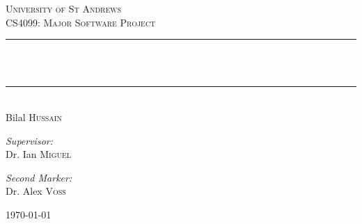 
\begin{titlepage}
\thispagestyle{empty}
\begin{center}



\textsc{\LARGE University of St Andrews}\\[10pt]
\textsc{\large CS4099: Major Software Project}\\[2cm]


\newcommand{\HRule}{\rule{9cm}{0.5mm}}

\HRule\\[10pt]
{ \Huge \bfseries \theTitle }\\
\HRule\\[20pt]
{ \LARGE Bilal \textsc{Hussain}}
\vspace{1.5cm}

\begin{minipage}{0.4\textwidth}
\begin{flushleft} \large
\emph{Supervisor:} \\
Dr. Ian  \textsc{Miguel}
\end{flushleft}
\end{minipage}
\begin{minipage}{0.4\textwidth}
\begin{flushright} \large
\emph{Second Marker:} \\
Dr. Alex \textsc{Voss}
\end{flushright}
\end{minipage}

\vfill

{\large \today}
\end{center}
\end{titlepage}
